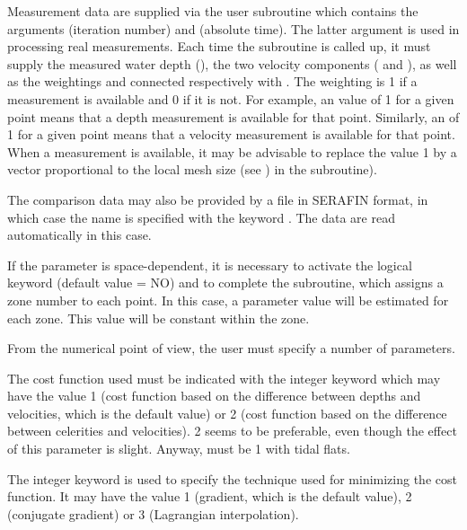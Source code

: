 Measurement data are supplied via the  user subroutine
which contains the arguments  (iteration number) and 
(absolute time).
The latter argument is used in processing real measurements.
Each time the  subroutine is called up,
it must supply the measured water depth (),
the two velocity components ( and ),
as well as the weightings  and 
connected respectively with .
The weighting is 1 if a measurement is available and 0 if it is not.
For example, an  value of 1 for a given point means
that a depth measurement is available for that point.
Similarly, an  of 1 for a given point means that a velocity
measurement  is available for that point.
When a measurement is available, it may be advisable to replace the value 1
by a vector proportional to the local mesh size
(see ) in the 
subroutine).

The comparison data may also be provided by a file in SERAFIN format,
in which case the name is specified with the keyword .
The data are read automatically in this case.

If the parameter is space-dependent, it is necessary to activate the logical
keyword  (default value = NO)
and to complete the  subroutine,
which assigns a zone number to each point.
In this case, a parameter value will be estimated for each zone.
This value will be constant within the zone.

From the numerical point of view, the user must specify a number of parameters.

The cost function used must be indicated with the integer keyword
 which may have the value 1 (cost function based on the
difference between depths and velocities, which is the default value)
or 2 (cost function based on the difference between celerities and velocities).
2 seems to be preferable, even though the effect of this parameter is slight.
Anyway,  must be 1 with tidal flats.

The integer keyword  is used to specify
the technique used for minimizing the cost function.
It may have the value 1 (gradient, which is the default value), 2 (conjugate
gradient) or 3 (Lagrangian interpolation).

